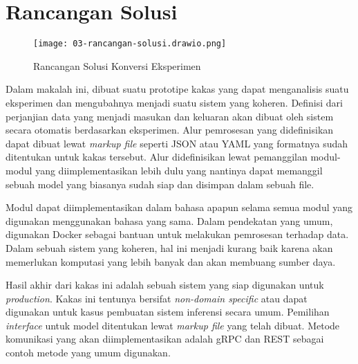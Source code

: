 \section{Rancangan Solusi}

\begin{figure}[ht]
  \centering
  \texttt{[image: 03-rancangan-solusi.drawio.png]}
  \caption{Rancangan Solusi Konversi Eksperimen}
\end{figure}

Dalam makalah ini, dibuat suatu prototipe kakas yang dapat menganalisis suatu eksperimen dan mengubahnya menjadi suatu sistem yang koheren.
Definisi dari perjanjian data yang menjadi masukan dan keluaran akan dibuat oleh sistem secara otomatis berdasarkan eksperimen.
Alur pemrosesan yang didefinisikan dapat dibuat lewat \textit{markup file} seperti JSON atau YAML yang formatnya sudah ditentukan untuk kakas tersebut.
Alur didefinisikan lewat pemanggilan modul-modul yang diimplementasikan lebih dulu yang nantinya dapat memanggil sebuah model yang biasanya sudah siap dan disimpan dalam sebuah file.

Modul dapat diimplementasikan dalam bahasa apapun selama semua modul yang digunakan menggunakan bahasa yang sama.
Dalam pendekatan yang umum, digunakan Docker sebagai bantuan untuk melakukan pemrosesan terhadap data.
Dalam sebuah sistem yang koheren, hal ini menjadi kurang baik karena akan memerlukan komputasi yang lebih banyak dan akan membuang sumber daya.

Hasil akhir dari kakas ini adalah sebuah sistem yang siap digunakan untuk \textit{production}.
Kakas ini tentunya bersifat \textit{non-domain specific} atau dapat digunakan untuk kasus pembuatan sistem inferensi secara umum.
Pemilihan \textit{interface} untuk model ditentukan lewat \textit{markup file} yang telah dibuat.
Metode komunikasi yang akan diimplementasikan adalah gRPC dan REST sebagai contoh metode yang umum digunakan.

